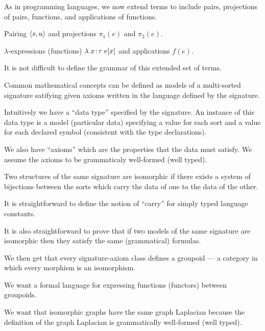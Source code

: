 {

As in programming languages, we now extend terms to include pairs, projections of pairs, functions, and applications of functions.

\vfill
Pairing {\color{red} ${\mbox{$\langle s,u\rangle$}}$} and projections {\color{red} $\pi_1(e)$} and {\color{red} $\pi_2(e)$}.

\vfill
$\lambda$-expressions (functions) {\color{red} $\lambda\; x\!:\!\tau\;e[x]$} and applications {\color{red} $f(e)$}.

\vfill
It is not difficult to define the grammar of this extended set of terms.


Common mathematical concepts can be defined as models of a multi-sorted signature satifying given axioms written in the language defined
by the signature.

\vfill
Intuitively we have a ``data type'' specified by the signature.  An instance of this data type is a model
(particular data) specifying a value for each sort
and a value for each declared symbol (consistent with the type declarations).

\vfill
We also have ``axioms'' which are the properties that the data must satisfy.  We assume the axioms to be grammaticaly well-formed (well typed).


Two structures of the same signature are isomorphic if there exists a system of bijections between the sorts which carry the data of one to the data of the other.

\vfill
It is straightforward to define the notion of ``carry'' for simply typed language constants.


\vfill
It is also straightforward to prove that
if two models of the same signature are isomorphic then they satisfy the same (grammatical) formulas.

\vfill
We then get that every signature-axiom class defines a groupoid --- a category in which every morphism is an isomorphism.


We want a formal language for expressing functions (functors) between groupoids.

\vfill
We want that isomorphic graphs have the same graph Laplacian because the definition of the graph Laplacian is grammatically well-formed (well typed).

}
